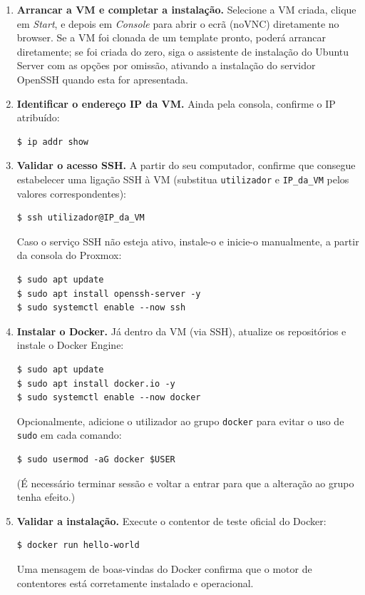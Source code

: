 \documentclass[11pt,a4paper]{article}
\begin{document}
\begin{enumerate}[label=\arabic*.]
  \item \textbf{Arrancar a VM e completar a instalação.} Selecione a VM criada, clique em \emph{Start}, e depois em \emph{Console} para abrir o ecrã (noVNC) diretamente no browser. Se a VM foi clonada de um template pronto, poderá arrancar diretamente; se foi criada do zero, siga o assistente de instalação do Ubuntu Server com as opções por omissão, ativando a instalação do servidor OpenSSH quando esta for apresentada.

  \item \textbf{Identificar o endereço IP da VM.} Ainda pela consola, confirme o IP atribuído:
\begin{lstlisting}
$ ip addr show
\end{lstlisting}

  \item \textbf{Validar o acesso SSH.} A partir do seu computador, confirme que consegue estabelecer uma ligação SSH à VM (substitua \texttt{utilizador} e \texttt{IP\_da\_VM} pelos valores correspondentes):
\begin{lstlisting}
$ ssh utilizador@IP_da_VM
\end{lstlisting}
  Caso o serviço SSH não esteja ativo, instale-o e inicie-o manualmente, a partir da consola do Proxmox:
\begin{lstlisting}
$ sudo apt update
$ sudo apt install openssh-server -y
$ sudo systemctl enable --now ssh
\end{lstlisting}

  \item \textbf{Instalar o Docker.} Já dentro da VM (via SSH), atualize os repositórios e instale o Docker Engine:
\begin{lstlisting}
$ sudo apt update
$ sudo apt install docker.io -y
$ sudo systemctl enable --now docker
\end{lstlisting}
  Opcionalmente, adicione o utilizador ao grupo \texttt{docker} para evitar o uso de \texttt{sudo} em cada comando:
\begin{lstlisting}
$ sudo usermod -aG docker $USER
\end{lstlisting}
  (É necessário terminar sessão e voltar a entrar para que a alteração ao grupo tenha efeito.)

  \item \textbf{Validar a instalação.} Execute o contentor de teste oficial do Docker:
\begin{lstlisting}
$ docker run hello-world
\end{lstlisting}
  Uma mensagem de boas-vindas do Docker confirma que o motor de contentores está corretamente instalado e operacional.


\end{enumerate}
\end{document}
